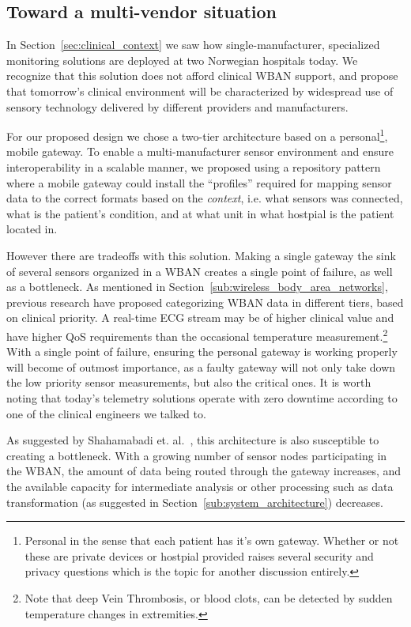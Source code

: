 \subsection{Toward a multi-vendor situation} %
\label{sub:toward_a_multi_vendor_situation}

In Section~\ref{sec:clinical_context} we saw how single-manufacturer, specialized monitoring solutions are deployed at two Norwegian hospitals today. We recognize that this solution does not afford clinical WBAN support, and propose that tomorrow's clinical environment will be characterized by widespread use of sensory technology delivered by different providers and manufacturers.

For our proposed design we chose a two-tier architecture based on a personal\footnote{ Personal in the sense that each patient has it's own gateway. Whether or not these are private devices or hostpial provided raises several security and privacy questions which is the topic for another discussion entirely.}, mobile gateway. To enable a multi-manufacturer sensor environment and ensure interoperability in a scalable manner, we proposed using a repository pattern where a mobile gateway could install the ``profiles'' required for mapping sensor data to the correct formats based on the \emph{context}, i.e. what sensors was connected, what is the patient's condition, and at what unit in what hostpial is the patient located in. 

However there are tradeoffs with this solution. Making a single gateway the sink of several sensors organized in a WBAN creates a single point of failure, as well as a bottleneck. As mentioned in Section~\ref{sub:wireless_body_area_networks}, previous research have proposed categorizing WBAN data in different tiers, based on clinical priority. A real-time ECG stream may be of higher clinical value and have higher QoS requirements than the occasional temperature measurement.\footnote{ Note that deep Vein Thrombosis, or blood clots, can be detected by sudden temperature changes in extremities.} With a single point of failure, ensuring the personal gateway is working properly will become of outmost importance, as a faulty gateway will not only take down the low priority sensor measurements, but also the critical ones. It is worth noting that today's telemetry solutions operate with zero downtime according to one of the clinical engineers we talked to.

As suggested by Shahamabadi et. al.~\cite{Shahamabadi:2013df}, this architecture is also susceptible to creating a bottleneck. With a growing number of sensor nodes participating in the WBAN, the amount of data being routed through the gateway increases, and the available capacity for intermediate analysis or other processing such as data transformation (as suggested in Section~\ref{sub:system_architecture}) decreases. 

